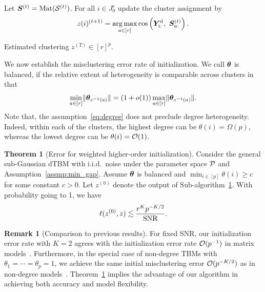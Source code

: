 \documentclass[lettersize,onecolumn,journal]{IEEEtran}
\theoremstyle{definition}
\newtheorem{thm}{Theorem}
\theoremstyle{definition}
\newtheorem{rmk}{Remark}
\begin{document}
\begin{algorithm}[h!]
\begin{algorithmic}[1]
\State Let $\bm S^{(t)} = \text{Mat}(\mathcal{S}^{(t)})$. For all $i \in J_0^c$ update the cluster assignment by
\begin{equation}
    z(i)^{(t+1)} = \operatorname*{arg\,max}_{a \in [r]} \cos \left( \bm Y^{\text{d}}_{i:},\ \bm S^{(t)}_{a:} \right).
\end{equation}

\EndFor

\OUTPUT Estimated clustering $z^{(T)}  \in [r]^{p}$.

\end{algorithmic}
\end{algorithm}

We now establish the misclustering error rate of initialization. We call $\boldsymbol{\theta}$ is balanced, if the relative extent of heterogeneity is comparable across clusters in that
\begin{equation}\label{eq:degree}
{\min_{a\in[r]} \onormSize{}{\mtheta_{z^{-1}(a)}}=\left(1+o(1)\right)\max_{a\in[r]}\onormSize{}{\mtheta_{z^{-1}(a)}}}.
\end{equation}
Note that, the assumption~\eqref{eq:degree} does not preclude degree heterogeneity. Indeed, within each of the clusters, the highest degree can be $\theta(i) = \Omega(p)$, whereas the lowest degree can be $\theta(i)=\mathcal{O}(1)$. 

\begin{thm}[Error for weighted higher-order initialization]\label{thm:initial} Consider the general sub-Gaussian dTBM with i.i.d.\ noise under the parameter space $\mathcal{P}$ and Assumption~\ref{assmp:min_gap}. Assume $\boldsymbol{\theta}$ is balanced and $\min_{i\in[p]}\theta(i) \geq c$ for some constant $c>0$. Let $ z^{(0)}$ denote the output of Sub-algorithm~\hyperref[alg:main]{1}. With probability going to 1, we have
\begin{equation}\label{eq:ini}
   \ell(z^{(0)}, z) \lesssim {r^K p^{-K/2}\over \text{SNR}}. 
\end{equation}
\end{thm}

\begin{rmk}[Comparison to previous results] For fixed SNR, our initialization error rate with $K=2$ agrees with the initialization error rate $\mathcal{O}(p^{-1})$ in matrix models~\citep{gao2018community}. Furthermore, in the special case of non-degree TBMs with $\theta_1=\cdots=\theta_p=1$, we achieve the same initial misclustering error $\mathcal{O}(p^{-K/2})$ as in non-degree models~\citep{han2020exact}. Theorem~\ref{thm:initial} implies the advantage of our algorithm in achieving both accuracy and model flexibility. 
\end{rmk}
\end{document}
